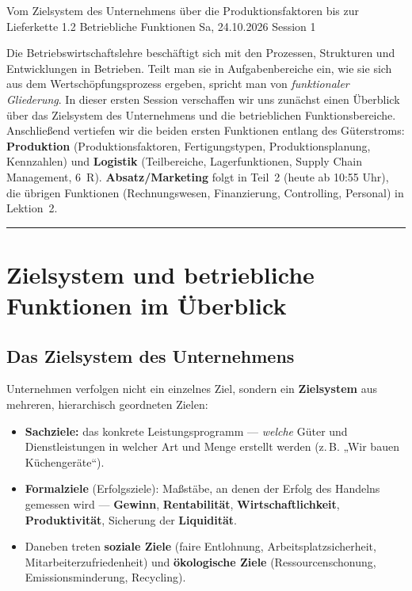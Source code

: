 \documentclass[11pt, a4paper]{article}
\begin{document}
%
  {Vom Zielsystem des Unternehmens über die Produktionsfaktoren bis zur Lieferkette}%
  {1.2 Betriebliche Funktionen}%
  {Sa, 24.10.2026 \textperiodcentered{} Session 1}

\begin{merksatz}[title={\bfseries Worum geht es in Teil 1?}]
Die Betriebswirtschaftslehre beschäftigt sich mit den Prozessen, Strukturen und
Entwicklungen in Betrieben. Teilt man sie in Aufgabenbereiche ein, wie sie sich aus dem
Wertschöpfungsprozess ergeben, spricht man von \emph{funktionaler Gliederung}. In dieser
ersten Session verschaffen wir uns zunächst einen Überblick über das Zielsystem des
Unternehmens und die betrieblichen Funktionsbereiche. Anschließend vertiefen wir die
beiden ersten Funktionen entlang des Güterstroms: \textbf{Produktion}
(Produktionsfaktoren, Fertigungstypen, Produktionsplanung, Kennzahlen) und
\textbf{Logistik} (Teilbereiche, Lagerfunktionen, Supply Chain Management, 6~R).
\textbf{Absatz/Marketing} folgt in Teil~2 (heute ab 10:55 Uhr), die übrigen Funktionen
(Rechnungswesen, Finanzierung, Controlling, Personal) in Lektion~2.
\end{merksatz}

\tableofcontents
\vspace{1em}
\hrule
\vspace{1em}

\section{Zielsystem und betriebliche Funktionen im Überblick}

\subsection{Das Zielsystem des Unternehmens}

Unternehmen verfolgen nicht ein einzelnes Ziel, sondern ein \textbf{Zielsystem} aus
mehreren, hierarchisch geordneten Zielen:

\begin{itemize}
  \item \textbf{Sachziele:} das konkrete Leistungsprogramm --- \emph{welche} Güter und
    Dienstleistungen in welcher Art und Menge erstellt werden (z.\,B. „Wir bauen
    Küchengeräte``).
  \item \textbf{Formalziele} (Erfolgsziele): Maßstäbe, an denen der Erfolg des Handelns
    gemessen wird --- \textbf{Gewinn}, \textbf{Rentabilität}, \textbf{Wirtschaftlichkeit},
    \textbf{Produktivität}, Sicherung der \textbf{Liquidität}.
  \item Daneben treten \textbf{soziale Ziele} (faire Entlohnung, Arbeitsplatzsicherheit,
    Mitarbeiterzufriedenheit) und \textbf{ökologische Ziele} (Ressourcenschonung,
    Emissionsminderung, Recycling).
\end{itemize}
\end{document}
